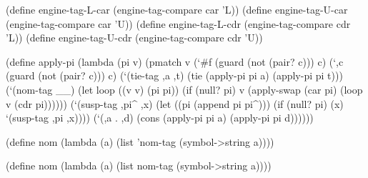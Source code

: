 \begin{schemedisplay}
(define engine-tag-L-car (engine-tag-compare car 'L))
(define engine-tag-U-car (engine-tag-compare car 'U))
(define engine-tag-L-cdr (engine-tag-compare cdr 'L))
(define engine-tag-U-cdr (engine-tag-compare cdr 'U))

(define apply-pi
  (lambda (pi v)
    (pmatch v
      (`#f (guard (not (pair? c))) c)
      (`,c (guard (not (pair? c))) c)
      (`(tie-tag ,a ,t) (tie (apply-pi pi a) (apply-pi pi t)))      
      (`(nom-tag __)
       (let loop ((v v) (pi pi))
         (if (null? pi) v (apply-swap (car pi) (loop v (cdr pi))))))
      (`(susp-tag ,pi^ ,x)
       (let ((pi (append pi pi^)))
         (if (null? pi) (x) `(susp-tag ,pi ,x))))
      (`(,a . ,d) (cons (apply-pi pi a) (apply-pi pi d))))))

(define nom
  (lambda (a)
    (list 'nom-tag (symbol->string a))))

(define nom
  (lambda (a)
    (list nom-tag (symbol->string a))))
\end{schemedisplay}
